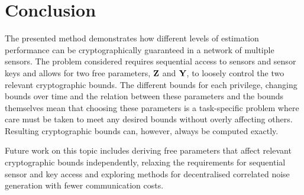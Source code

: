 \documentclass[conference]{IEEEtran}
\theoremstyle{definition}
\theoremstyle{remark}
\begin{document}
\section{Conclusion}\label{sec:conc}
The presented method demonstrates how different levels of estimation performance can be cryptographically guaranteed in a network of multiple sensors. The problem considered requires sequential access to sensors and sensor keys and allows for two free parameters, ${{\mathbf{Z}}}$ and ${{\mathbf{Y}}}$, to loosely control the two relevant cryptographic bounds. The different bounds for each privilege, changing bounds over time and the relation between these parameters and the bounds themselves mean that choosing these parameters is a task-specific problem where care must be taken to meet any desired bounds without overly affecting others. Resulting cryptographic bounds can, however, always be computed exactly.

Future work on this topic includes deriving free parameters that affect relevant cryptographic bounds independently, relaxing the requirements for sequential sensor and key access and exploring methods for decentralised correlated noise generation with fewer communication costs.



% 
%                                            
%                                            
%                                            
% 




\end{document}
